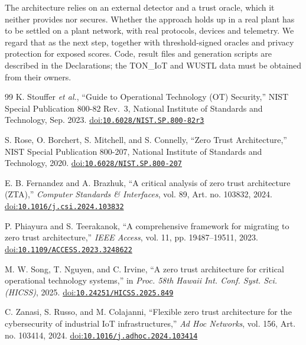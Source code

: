 The architecture relies on an external detector and a trust oracle, which it neither provides nor secures. Whether the approach holds up in a real plant has to be settled on a plant network, with real protocols, devices and telemetry. We regard that as the next step, together with threshold-signed oracles and privacy protection for exposed scores. Code, result files and generation scripts are described in the Declarations; the TON\_IoT and WUSTL data must be obtained from their owners.


\begingroup\small{}

\begin{thebibliography}{99}\small
\setlength{\itemsep}{0pt}
\setlength{\parskip}{0pt}
\small
\setlength{\itemsep}{0pt}
\setlength{\parskip}{0pt}
K. Stouffer \emph{et al.}, ``Guide to Operational Technology (OT) Security,'' NIST Special Publication 800-82 Rev.~3, National Institute of Standards and Technology, Sep. 2023. \href{https://doi.org/10.6028/NIST.SP.800-82r3}{doi:\nolinkurl{10.6028/NIST.SP.800-82r3}}

S. Rose, O. Borchert, S. Mitchell, and S. Connelly, ``Zero Trust Architecture,'' NIST Special Publication 800-207, National Institute of Standards and Technology, 2020. \href{https://doi.org/10.6028/NIST.SP.800-207}{doi:\nolinkurl{10.6028/NIST.SP.800-207}}

E. B. Fernandez and A. Brazhuk, ``A critical analysis of zero trust architecture (ZTA),'' \emph{Computer Standards \& Interfaces}, vol. 89, Art. no. 103832, 2024. \href{https://doi.org/10.1016/j.csi.2024.103832}{doi:\nolinkurl{10.1016/j.csi.2024.103832}}

P. Phiayura and S. Teerakanok, ``A comprehensive framework for migrating to zero trust architecture,'' \emph{IEEE Access}, vol. 11, pp. 19487--19511, 2023. \href{https://doi.org/10.1109/ACCESS.2023.3248622}{doi:\nolinkurl{10.1109/ACCESS.2023.3248622}}

M. W. Song, T. Nguyen, and C. Irvine, ``A zero trust architecture for critical operational technology systems,'' in \emph{Proc. 58th Hawaii Int. Conf. Syst. Sci. (HICSS)}, 2025. \href{https://doi.org/10.24251/HICSS.2025.849}{doi:\nolinkurl{10.24251/HICSS.2025.849}}

C. Zanasi, S. Russo, and M. Colajanni, ``Flexible zero trust architecture for the cybersecurity of industrial IoT infrastructures,'' \emph{Ad Hoc Networks}, vol. 156, Art. no. 103414, 2024. \href{https://doi.org/10.1016/j.adhoc.2024.103414}{doi:\nolinkurl{10.1016/j.adhoc.2024.103414}}


\end{thebibliography}
